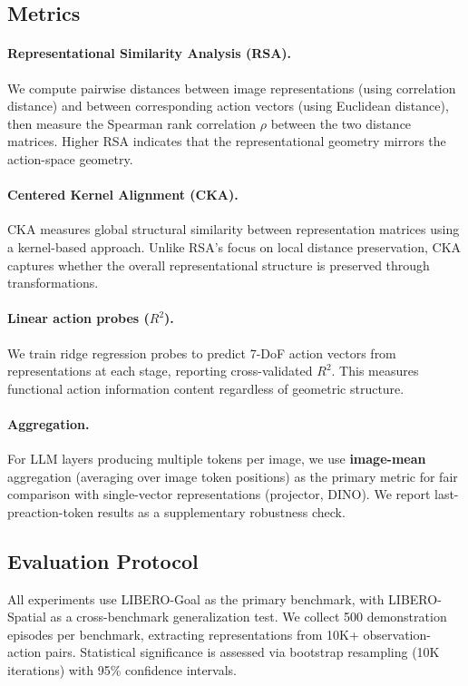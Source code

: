\documentclass[letterpaper]{article}
\begin{document}
\subsection{Metrics}

\paragraph{Representational Similarity Analysis (RSA).}
We compute pairwise distances between image representations (using correlation distance) and between corresponding action vectors (using Euclidean distance), then measure the Spearman rank correlation $\rho$ between the two distance matrices. Higher RSA indicates that the representational geometry mirrors the action-space geometry.

\paragraph{Centered Kernel Alignment (CKA).}
CKA measures global structural similarity between representation matrices using a kernel-based approach. Unlike RSA's focus on local distance preservation, CKA captures whether the overall representational structure is preserved through transformations.

\paragraph{Linear action probes ($R^2$).}
We train ridge regression probes to predict 7-DoF action vectors from representations at each stage, reporting cross-validated $R^2$. This measures functional action information content regardless of geometric structure.

\paragraph{Aggregation.}
For LLM layers producing multiple tokens per image, we use \textbf{image-mean} aggregation (averaging over image token positions) as the primary metric for fair comparison with single-vector representations (projector, DINO). We report last-preaction-token results as a supplementary robustness check.

\subsection{Evaluation Protocol}
All experiments use LIBERO-Goal as the primary benchmark, with LIBERO-Spatial as a cross-benchmark generalization test. We collect 500 demonstration episodes per benchmark, extracting representations from 10K+ observation-action pairs. Statistical significance is assessed via bootstrap resampling (10K iterations) with 95\% confidence intervals.
\end{document}
